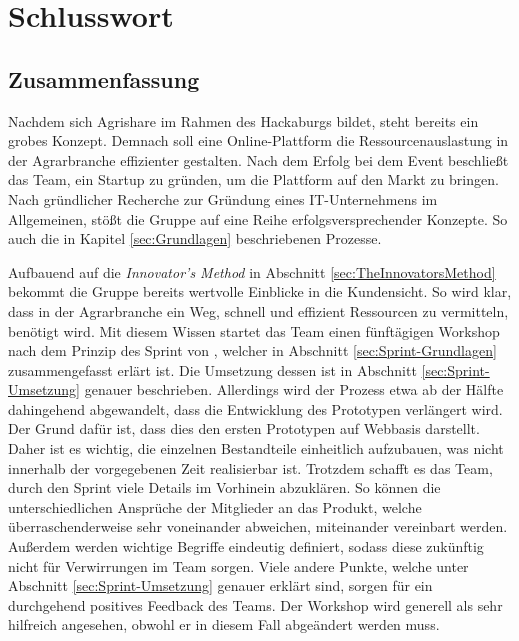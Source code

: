 \chapter{Schlusswort}
\section{Zusammenfassung}
Nachdem sich Agrishare im Rahmen des Hackaburgs bildet, steht bereits ein grobes Konzept. Demnach soll eine Online-Plattform die Ressourcenauslastung in der Agrarbranche effizienter gestalten. Nach dem Erfolg bei dem Event beschließt das Team, ein Startup zu gründen, um die Plattform auf den Markt zu bringen. Nach gründlicher Recherche zur Gründung eines IT-Unternehmens im Allgemeinen, stößt die Gruppe auf eine Reihe erfolgsversprechender Konzepte. So auch die in Kapitel \ref{sec:Grundlagen} beschriebenen Prozesse. 

Aufbauend auf die \textit{Innovator's Method} in Abschnitt \ref{sec:TheInnovatorsMethod} bekommt die Gruppe bereits wertvolle Einblicke in die Kundensicht. So wird klar, dass in der Agrarbranche ein Weg, schnell und effizient Ressourcen zu vermitteln, benötigt wird. Mit diesem Wissen startet das Team einen fünftägigen Workshop nach dem Prinzip des Sprint von \citeauthor{Sprint}, welcher in Abschnitt \ref{sec:Sprint-Grundlagen} zusammengefasst erlärt ist. Die Umsetzung dessen ist in Abschnitt \ref{sec:Sprint-Umsetzung} genauer beschrieben. Allerdings wird der Prozess etwa ab der Hälfte dahingehend abgewandelt, dass die Entwicklung des Prototypen verlängert wird. Der Grund dafür ist, dass dies den ersten Prototypen auf Webbasis darstellt. Daher ist es wichtig, die einzelnen Bestandteile einheitlich aufzubauen, was nicht innerhalb der vorgegebenen Zeit realisierbar ist. Trotzdem schafft es das Team, durch den Sprint viele Details im Vorhinein abzuklären. So können die unterschiedlichen Ansprüche der Mitglieder an das Produkt, welche überraschenderweise sehr voneinander abweichen, miteinander vereinbart werden. Außerdem werden wichtige Begriffe eindeutig definiert, sodass diese zukünftig nicht für Verwirrungen im Team sorgen. Viele andere Punkte, welche unter Abschnitt \ref{sec:Sprint-Umsetzung} genauer erklärt sind, sorgen für ein durchgehend positives Feedback des Teams. Der Workshop wird generell als sehr hilfreich angesehen, obwohl er in diesem Fall abgeändert werden muss. 

